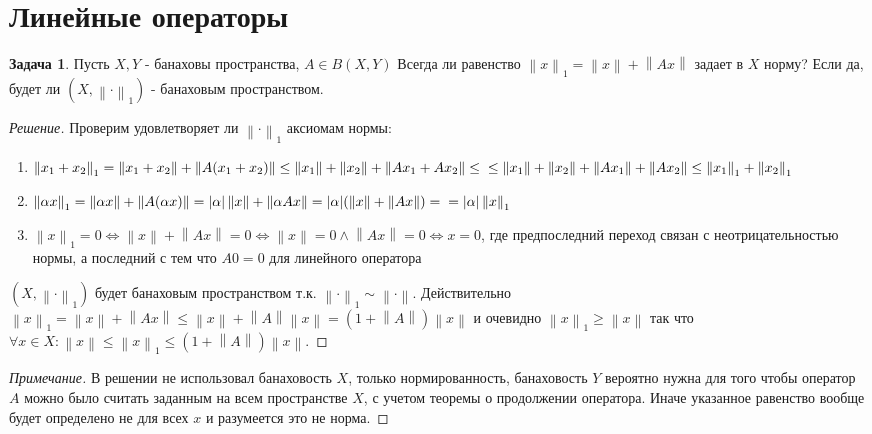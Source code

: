 \documentclass[12pt,a4paper]{article}
\theoremstyle{definition}
\newtheorem{exercise}{Задача}[section]
\newenvironment{solution}
{\renewcommand\qedsymbol{$\blacksquare$}\begin{proof}[Решение]}
{\end{proof}}
\newenvironment{note}
{\renewcommand\qedsymbol{}\begin{proof}[Примечание]}
	{\end{proof}}
\newcommand{\norm}[1]{\left\lVert#1\right\rVert}
\begin{document}
\section{Линейные операторы}
	
\begin{exercise}
	Пусть $X,Y$ - банаховы пространства, $A\in B(X,Y)$ Всегда ли равенство $\norm{x}_1 = \norm{x} + \norm{Ax}$ задает в $X$ норму? Если да, будет ли $(X, \norm{\cdot}_1)$ - банаховым пространством.
\end{exercise}
\begin{solution}
	Проверим удовлетворяет ли $\norm{\cdot}_1$ аксиомам нормы:
	\begin{enumerate}
		\item $\norm{x_1 + x_2}_1 = \norm{x_1 + x_2} + \norm{A(x_1 + x_2)} \leq \norm{x_1} + \norm{x_2} + \norm{Ax_1 + Ax_2} \leq \newline
		\leq \norm{x_1} + \norm{x_2} + \norm{Ax_1} + \norm{Ax_2}
		\leq \norm{x_1}_1 + \norm{x_2}_1$
			
		\item $\norm{\alpha x}_1 = \norm{\alpha x} + \norm{A(\alpha x)} = |\alpha| \norm{x} + \norm{\alpha Ax} = |\alpha| (\norm{x} + \norm{Ax}) = \newline = |\alpha|\norm{x}_1$
			
		\item $\norm{x}_1 = 0 \Leftrightarrow \norm{x} + \norm{Ax} = 0 \Leftrightarrow \norm{x} = 0 \wedge \norm{Ax} = 0 \Leftrightarrow x = 0$, где предпоследний переход связан с неотрицательностью нормы, а последний с тем что $A0=0$ для линейного оператора
	\end{enumerate}
	$(X, \norm{\cdot}_1)$ будет банаховым пространством т.к. $\norm{\cdot}_1 \sim \norm{\cdot}$. Действительно \\ $\norm{x}_1 = \norm{x} + \norm{Ax} \leq \norm{x} + \norm{A}\norm{x} = (1 + \norm{A})\norm{x}$ и очевидно $\norm{x}_1 \geq \norm{x}$ так что
	$\forall x\in X : \norm{x} \leq \norm{x}_1 \leq (1 + \norm{A})\norm{x}$.
\end{solution}

\begin{note}
	В решении не использовал банаховость $X$, только нормированность, банаховость $Y$ вероятно нужна для того чтобы оператор $A$ можно было считать заданным на всем пространстве $X$, с учетом теоремы о продолжении оператора. Иначе указанное равенство вообще будет определено не для всех $x$ и разумеется это не норма.
\end{note}
\end{document}
